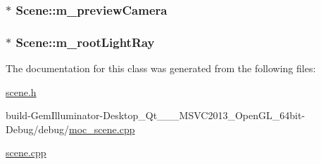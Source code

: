 \hypertarget{class_scene_af1841b6c042a5edcf39653706f17cdd1}{
\subsubsection[{m\+\_\+preview\+Camera}]{$\ast$ Scene\+::m\+\_\+preview\+Camera\hspace{0.3cm}{\ttfamily [protected]}}}\label{class_scene_af1841b6c042a5edcf39653706f17cdd1}
\hypertarget{class_scene_a766daf7b6a92c877f1fc57f3d8af9959}{
\subsubsection[{m\+\_\+root\+Light\+Ray}]{$\ast$ Scene\+::m\+\_\+root\+Light\+Ray\hspace{0.3cm}{\ttfamily [protected]}}}\label{class_scene_a766daf7b6a92c877f1fc57f3d8af9959}


The documentation for this class was generated from the following files\+:\begin{DoxyCompactItemize}
\item 
\hyperlink{scene_8h}{scene.\+h}\item 
build-\/\+Gem\+Illuminator-\/\+Desktop\+\_\+\+Qt\+\_\+\_\+\_\+\+M\+S\+V\+C2013\+\_\+\+Open\+G\+L\+\_\+64bit-\/\+Debug/debug/\hyperlink{moc__scene_8cpp}{moc\+\_\+scene.\+cpp}\item 
\hyperlink{scene_8cpp}{scene.\+cpp}\end{DoxyCompactItemize}
